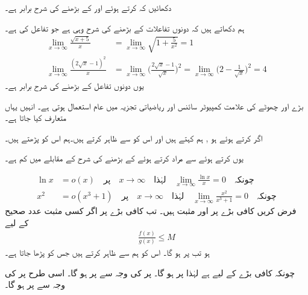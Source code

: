 دکھائیں کہ  کرتے ہوئے  اور  کے بڑھنے کی شرح  برابر ہے۔

ہم دکھاتے ہیں کہ دونوں تفاعلات کے بڑھنے کی شرح وہی ہے جو تفاعل  کی ہے۔
\begin{align*}
\lim_{x\to\infty}\frac{\sqrt{x+5}}{x}&=\lim_{x\to\infty}\sqrt{1+\frac{5}{x^2}}=1\\
\lim_{x\to\infty}\frac{(2\sqrt{x}-1)^2}{x}&=\lim_{x\to \infty}\big(\frac{2\sqrt{x}-1}{\sqrt{x}}\big)^2=\lim_{x\to\infty}\big(2-\frac{1}{\sqrt{x}}\big)^2=4
\end{align*}
یوں دونوں تفاعل کے بڑھنے کی شرح  برابر ہے۔

بڑے  اور چھوٹے  کی علامت کمپیوٹر سائنس اور ریاضیاتی تجزیہ  میں عام استعمال ہوتی ہے۔ انہیں یہاں متعارف کیا جاتا ہے۔

اگر  کرتے ہوئے  ہو  , ہم کہتے ہیں  اور اس  کو   سے ظاہر کرتے ہیں۔ہم  اس کو  پڑھتے ہیں۔ 

یوں  کرتے ہوئے   سے مراد  کرتے ہوئے  کے بڑھنے کی شرح   کے مقابلے میں کم ہے۔

\begin{align*}
\ln x&=o(x) \quad \text{پر}\quad x\to\infty\quad \text{لہٰذا}\quad \lim_{x\to\infty}\frac{\ln x}{x}=0\quad \text{چونکہ}\\
x^2&=o(x^3+1) \quad \text{پر}\quad x\to\infty\quad \text{لہٰذا}\quad \lim_{x\to\infty}\frac{x^2}{x^3+1}=0\quad \text{چونکہ}
\end{align*}
فرض کریں کافی بڑے  پر  اور  مثبت ہیں۔ تب کافی بڑے   پر اگر کسی مثبت عدد صحیح  کے لیے
\begin{align*}
\frac{f(x)}{g(x)}\le M
\end{align*}
ہو تب  پر ہو گا۔ اس کو ہم  سے ظاہر کرتے ہیں جس
 کو   پڑھا جاتا ہے۔

چونکہ کافی بڑے  کے لیے  ہے لہٰذا  پر  ہو گا۔
 پر   کی وجہ سے  پر  ہو گا۔ اسی طرح 
 پر   کی وجہ سے  پر  ہو گا۔

